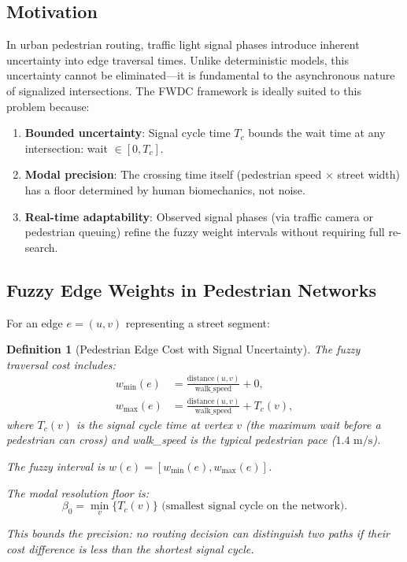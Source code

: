 \documentclass[twocolumn,11pt,a4paper]{article}
\newtheorem{definition}[theorem]{Definition}
\theoremstyle{definition}
\begin{document}
\subsection{Motivation}

In urban pedestrian routing, traffic light signal phases introduce inherent uncertainty into edge traversal times. Unlike deterministic models, this uncertainty cannot be eliminated---it is fundamental to the asynchronous nature of signalized intersections. The FWDC framework is ideally suited to this problem because:

\begin{enumerate}
\item \textbf{Bounded uncertainty}: Signal cycle time $T_c$ bounds the wait time at any intersection: wait $\in [0, T_c]$.
\item \textbf{Modal precision}: The crossing time itself (pedestrian speed $\times$ street width) has a floor determined by human biomechanics, not noise.
\item \textbf{Real-time adaptability}: Observed signal phases (via traffic camera or pedestrian queuing) refine the fuzzy weight intervals without requiring full re-search.
\end{enumerate}

\subsection{Fuzzy Edge Weights in Pedestrian Networks}

For an edge $e = (u, v)$ representing a street segment:

\begin{definition}[Pedestrian Edge Cost with Signal Uncertainty]
The fuzzy traversal cost includes:
\begin{align}
w_{\min}(e) &= \frac{\text{distance}(u,v)}{\text{walk\_speed}} + 0, \\
w_{\max}(e) &= \frac{\text{distance}(u,v)}{\text{walk\_speed}} + T_c(v),
\end{align}
where $T_c(v)$ is the signal cycle time at vertex $v$ (the maximum wait before a pedestrian can cross) and walk\_speed is the typical pedestrian pace ($1.4 \text{ m/s}$).

The fuzzy interval is $w(e) = [w_{\min}(e), w_{\max}(e)]$.

The modal resolution floor is:
\begin{equation}
\beta_0 = \min_v \{T_c(v)\} \text{ (smallest signal cycle on the network)}.
\end{equation}

This bounds the precision: no routing decision can distinguish two paths if their cost difference is less than the shortest signal cycle.
\end{definition}
\end{document}

